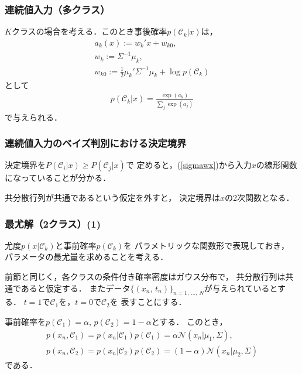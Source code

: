 \documentclass[10pt,%
hyperref={unicode}]{beamer}
\newcommand{\braref}[1]{{\fontfamily{cmr}\selectfont (\ref{#1})}}
\begin{document}
\begin{frame}
    \frametitle{連続値入力（多クラス）}

    $K$クラスの場合を考える．このとき事後確率$p(\mathcal{C}_k|x)$は，
    \begin{gather}
        a_k(x) := w_k'x + w_{k0}, \tag{4.68} \\
        w_k := \varSigma^{-1} \mu_k, \tag{4.69} \\
        w_{k0} := \frac{1}{2}\mu_k'\varSigma^{-1}\mu_k
        + \log p(\mathcal{C}_k) \tag{4.70}
    \end{gather}
    として
    \begin{align*}
        p(\mathcal{C}_k|x) = \frac{\exp(a_k)}{\sum_j \exp(a_j)}
    \end{align*}
    で与えられる．
\end{frame}

\begin{frame}
    \frametitle{連続値入力のベイズ判別における決定境界}
    決定境界を$P(\mathcal{C}_i|x) \geq P(\mathcal{C}_j|x)$で
    定めると，\braref{sigmawx}から入力$x$の線形関数になっていることが分かる．

    \bigskip

    共分散行列が共通であるという仮定を外すと，
    決定境界は$x$の2次関数となる．
\end{frame}

\begin{frame}
    \frametitle{最尤解（2クラス）(1)}
    尤度$p(x|\mathcal{C}_k)$と事前確率$p(\mathcal{C}_k)$を
    パラメトリックな関数形で表現しておき，
    パラメータの最尤量を求めることを考える．

    \bigskip

    前節と同じく，各クラスの条件付き確率密度はガウス分布で，
    共分散行列は共通であると仮定する．
    またデータ$\{(x_n,\,t_n)\}_{n = 1,\,\ldots,\,N}$が与えられているとする．
    $t = 1$で$\mathcal{C}_1$を，$t = 0$で$\mathcal{C}_2$を
    表すことにする．

    \bigskip

    事前確率を$p(\mathcal{C}_1) = \alpha,\,p(\mathcal{C}_2) = 1 - \alpha$とする．
    このとき，
    \begin{gather*}
        p(x_n,\mathcal{C}_1) = p(x_n|\mathcal{C}_1) p(\mathcal{C}_1)
                               = \alpha \mathcal{N}(x_n|\mu_1,\varSigma), \\
        p(x_n,\mathcal{C}_2) = p(x_n|\mathcal{C}_2) p(\mathcal{C}_2)
                               = (1 - \alpha) \mathcal{N}(x_n|\mu_2,\varSigma)
    \end{gather*}
    である．
\end{frame}
\end{document}
